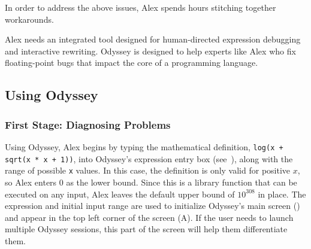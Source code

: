 
In order to address the above issues,
  Alex spends hours stitching together workarounds.

Alex needs an integrated tool 
  designed for human-directed expression debugging and interactive rewriting.
Odyssey is designed to help experts like Alex who fix floating-point bugs that impact the core of a programming language.

\subsection{Using Odyssey}
\subsubsection*{First Stage: Diagnosing Problems}

Using Odyssey, Alex begins by typing the mathematical definition,
  \texttt{log(x + sqrt(x * x + 1))},
  into Odyssey's expression entry box (see~),
  along with the range of possible \texttt{x} values.
In this case, the definition is only valid for positive $x$,
  so Alex enters $0$ as the lower bound.
  Since this is a library function that can be executed on any input,
  Alex leaves the default upper bound of $10^{308}$ in place.
The expression and initial input range
  are used to initialize Odyssey's main screen ()
  and appear in the top left corner of the screen (A).
If the user needs to launch multiple Odyssey sessions,
  this part of the screen will help them differentiate them.

